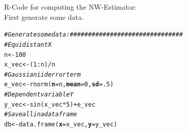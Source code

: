 \documentclass[14pt]{extreport}\usepackage[]{graphicx}\usepackage[]{xcolor}
\makeatletter
\newcommand{\hlnum}[1]{\textcolor[rgb]{0.69,0.494,0}{#1}}%
\newcommand{\hlcom}[1]{\textcolor[rgb]{0.514,0.506,0.514}{\textit{#1}}}%
\newcommand{\hlopt}[1]{\textcolor[rgb]{0,0,0}{#1}}%
\newcommand{\hlstd}[1]{\textcolor[rgb]{0,0,0}{#1}}%
\newcommand{\hlkwb}[1]{\textcolor[rgb]{0,0.341,0.682}{#1}}%
\newcommand{\hlkwc}[1]{\textcolor[rgb]{0,0,0}{\textbf{#1}}}%
\newcommand{\hlkwd}[1]{\textcolor[rgb]{0.004,0.004,0.506}{#1}}%
\newenvironment{kframe}{%
 \def\at@end@of@kframe{}%
 \ifinner\ifhmode%
  \def\at@end@of@kframe{\end{minipage}}%
  \begin{minipage}{\columnwidth}%
 \fi\fi%
 \def\FrameCommand##1{\hskip\@totalleftmargin \hskip-\fboxsep
 \colorbox{shadecolor}{##1}\hskip-\fboxsep
     \hskip-\linewidth \hskip-\@totalleftmargin \hskip\columnwidth}%
 \MakeFramed {\advance\hsize-\width
   \@totalleftmargin\z@ \linewidth\hsize
   \@setminipage}}%
 {\par\unskip\endMakeFramed%
 \at@end@of@kframe}
\newenvironment{knitrout}{}{} %
\makeatother
\begin{document}
% 





R-Code for computing the NW-Estimator:\\
First generate some data.
\begin{knitrout}
\color{fgcolor}\begin{kframe}
\begin{alltt}
\hlcom{# Generate some data: ###############################}
\hlcom{# Equidistant X }
\hlstd{n}      \hlkwb{<-} \hlnum{100}
\hlstd{x_vec}  \hlkwb{<-} \hlstd{(}\hlnum{1}\hlopt{:}\hlstd{n)}\hlopt{/}\hlstd{n}
\hlcom{# Gaussian iid error term }
\hlstd{e_vec}  \hlkwb{<-} \hlkwd{rnorm}\hlstd{(}\hlkwc{n} \hlstd{= n,} \hlkwc{mean} \hlstd{=} \hlnum{0}\hlstd{,} \hlkwc{sd} \hlstd{=} \hlnum{.5}\hlstd{)}
\hlcom{# Dependent variable Y}
\hlstd{y_vec}  \hlkwb{<-}  \hlkwd{sin}\hlstd{(x_vec} \hlopt{*} \hlnum{5}\hlstd{)} \hlopt{+} \hlstd{e_vec}
\hlcom{# Save all in a dataframe}
\hlstd{db}     \hlkwb{<-}  \hlkwd{data.frame}\hlstd{(}\hlkwc{x}\hlstd{=x_vec,}\hlkwc{y}\hlstd{=y_vec)}
\end{alltt}
\end{kframe}
\end{knitrout}
\end{document}
